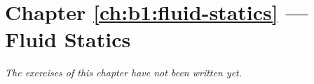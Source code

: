 \section*{Chapter \ref{ch:b1:fluid-statics} --- Fluid Statics}


\emph{The exercises of this chapter have not been written yet.}
